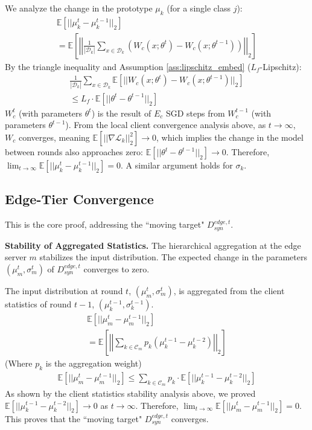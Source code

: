 We analyze the change in the prototype $\mu_k$ (for a single class $j$):
\begin{multline}
    \mathbb{E}[||\mu_k^t - \mu_k^{t-1}||_2] \\
    = \mathbb{E}\left[ \left|\left| \frac{1}{|\mathcal{D}_k|} \sum_{x \in \mathcal{D}_k} (W_c(x; \theta^t) - W_c(x; \theta^{t-1})) \right|\right|_2 \right]
\end{multline}
By the triangle inequality and Assumption \cref{ass:lipschitz_embed} ($L_f$-Lipschitz):
\begin{multline}
    \frac{1}{|\mathcal{D}_k|} \sum_{x \in \mathcal{D}_k} \mathbb{E}[||W_c(x; \theta^t) - W_c(x; \theta^{t-1})||_2] \\ \le L_f \cdot \mathbb{E}[||\theta^t - \theta^{t-1}||_2]
\end{multline}
$W_c^t$ (with parameters $\theta^t$) is the result of $E_c$ SGD steps from $W_c^{t-1}$ (with parameters $\theta^{t-1}$). From the local client convergence analysis above, as $t \to \infty$, $W_c$ converges, meaning $\mathbb{E}[||\nabla \mathcal{L}_k||_2^2] \to 0$, which implies the change in the model between rounds also approaches zero: $\mathbb{E}[||\theta^t - \theta^{t-1}||_2] \to 0$.
Therefore, $\lim_{t \to \infty} \mathbb{E}[||\mu_k^t - \mu_k^{t-1}||_2] = 0$. A similar argument holds for $\sigma_k$.


\subsection*{Edge-Tier Convergence}
\label{sec:part2}
This is the core proof, addressing the ``moving target" $D_{syn}^{edge, t}$.

\noindent\textbf{Stability of Aggregated Statistics.}
The hierarchical aggregation at the edge server $m$ stabilizes the input distribution. The expected change in the parameters $(\mu_m^t, \sigma_m^t)$ of $D_{syn}^{edge, t}$ converges to zero.

The input distribution at round $t$, $(\mu_m^t, \sigma_m^t)$, is aggregated from the client statistics of round $t-1$, $(\mu_k^{t-1}, \sigma_k^{t-1})$.
\begin{multline}
    \mathbb{E}[||\mu_m^t - \mu_m^{t-1}||_2]  \\ 
    = \mathbb{E}\left[ \left|\left| \sum_{k \in \mathcal{C}_m} p_k (\mu_k^{t-1} - \mu_k^{t-2}) \right|\right|_2 \right]
\end{multline}
(Where $p_k$ is the aggregation weight)
\begin{multline}
     \mathbb{E}[||\mu_m^t - \mu_m^{t-1}||_2] \le \sum_{k \in \mathcal{C}_m} p_k \cdot \mathbb{E}[||\mu_k^{t-1} - \mu_k^{t-2}||_2]
\end{multline}
As shown by the client statistics stability analysis above, we proved $\mathbb{E}[||\mu_k^{t-1} - \mu_k^{t-2}||_2] \to 0$ as $t \to \infty$. Therefore, $\lim_{t \to \infty} \mathbb{E}[||\mu_m^t - \mu_m^{t-1}||_2] = 0$.
This proves that the ``moving target" $D_{syn}^{edge, t}$ converges.


